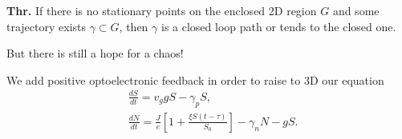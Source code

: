\textbf{Thr.} If there is no stationary points on the enclosed 2D region $G$ and some trajectory exists $\gamma \subset G$, then $\gamma$ is a closed loop path or tends to the closed one.

\phantom{239}

But there is still a hope for a chaos!

\phantom{239}

We add positive optoelectronic feedback in order to raise to 3D our equation
\begin{align*}
	&\frac{d S}{d t} = v_g g S - \gamma_p S,\\
	&\frac{d N}{d t} = \frac{J}{e}[1 + \frac{\xi S(t-\tau)}{S_0}] - \gamma_n N - g S.
\end{align*}